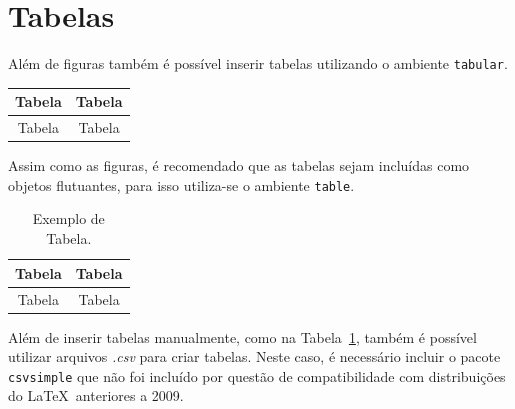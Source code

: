 \section{Tabelas}
Além de figuras também é possível inserir tabelas utilizando o ambiente
\lstinline+tabular+. \\
\begin{tabular}{cc}
  \toprule
  Tabela & Tabela \\
  \midrule
  Tabela & Tabela \\
  \bottomrule
\end{tabular}

Assim como as figuras, é recomendado que as tabelas sejam incluídas como
objetos flutuantes, para isso utiliza-se o ambiente \lstinline+table+.
\begin{table}[!htb]
  \caption{Exemplo de Tabela.}
  \label{tab:exem}
  \centering
  \begin{tabular}{cc}
    \toprule
    Tabela & Tabela \\
    \midrule
    Tabela & Tabela \\
    \bottomrule
  \end{tabular}
\end{table}

Além de inserir tabelas manualmente, como na Tabela~\ref{tab:exem}, também é
possível utilizar arquivos \emph{.csv} para criar tabelas. Neste caso, é
necessário incluir o pacote \texttt{csvsimple} que não foi incluído por questão
de compatibilidade com distribuições do \LaTeX \ anteriores a 2009.

